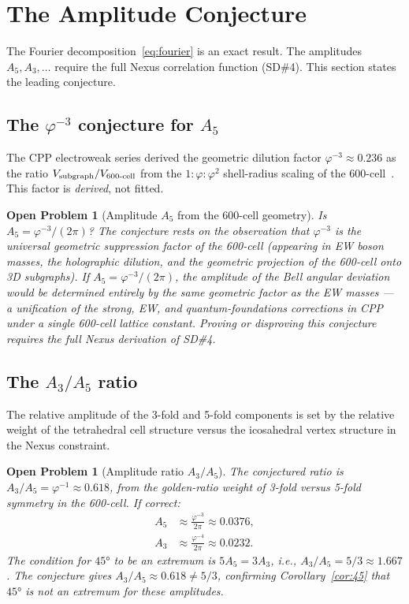 \documentclass[11pt,letterpaper]{article}
\newtheorem{openprob}[theorem]{Open Problem}
\newcommand{\phig}{\varphi}
\begin{document}
\section{The Amplitude Conjecture}
\label{sec:conjecture}

The Fourier decomposition~\eqref{eq:fourier} is an exact result.
The amplitudes $A_5, A_3, \ldots$ require the full Nexus correlation
function (SD\#4).  This section states the leading conjecture.

\subsection{The $\phig^{-3}$ conjecture for $A_5$}

The CPP electroweak series derived the geometric dilution factor
$\phig^{-3} \approx 0.236$ as the ratio $V_{\rm subgraph}/V_{\rm
600\text{-}cell}$ from the $1:\phig:\phig^2$ shell-radius scaling of
the 600-cell~\citep{cpp_ew_unified}.  This factor is \emph{derived},
not fitted.

\begin{openprob}[Amplitude $A_5$ from the 600-cell geometry]
\label{op:A5}
Is $A_5 = \phig^{-3}/(2\pi)$?  The conjecture rests on the
observation that $\phig^{-3}$ is the universal geometric suppression
factor of the 600-cell (appearing in EW boson masses, the
holographic dilution, and the geometric projection of the 600-cell
onto 3D subgraphs).  If $A_5 = \phig^{-3}/(2\pi)$, the amplitude of
the Bell angular deviation would be determined entirely by the same
geometric factor as the EW masses --- a unification of the strong,
EW, and quantum-foundations corrections in CPP under a single
600-cell lattice constant.  Proving or disproving this conjecture
requires the full Nexus derivation of SD\#4.
\end{openprob}

\subsection{The $A_3/A_5$ ratio}

The relative amplitude of the 3-fold and 5-fold components is set by
the relative weight of the tetrahedral cell structure versus the
icosahedral vertex structure in the Nexus constraint.

\begin{openprob}[Amplitude ratio $A_3/A_5$]
\label{op:ratio}
The conjectured ratio is $A_3/A_5 = \phig^{-1} \approx 0.618$,
from the golden-ratio weight of 3-fold versus 5-fold symmetry in the
600-cell.  If correct:
\begin{align}
A_5 &\approx \frac{\phig^{-3}}{2\pi} \approx 0.0376, \label{eq:A5} \\
A_3 &\approx \frac{\phig^{-4}}{2\pi} \approx 0.0232. \label{eq:A3}
\end{align}
The condition for $45°$ to be an extremum is $5A_5 = 3A_3$, i.e.,
$A_3/A_5 = 5/3 \approx 1.667$.  The conjecture gives
$A_3/A_5 \approx 0.618 \neq 5/3$, confirming Corollary~\ref{cor:45}
that $45°$ is not an extremum for these amplitudes.
\end{openprob}
\end{document}
